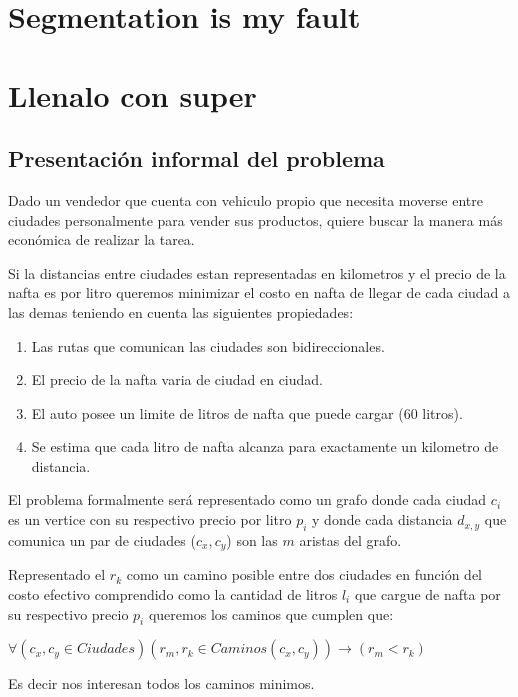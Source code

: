 \documentclass[12pt]{article}
\begin{document}
\section{Segmentation is my fault}



\section{Llenalo con super}

\subsection{Presentación informal del problema}
Dado un vendedor que cuenta con vehiculo propio que necesita moverse entre ciudades personalmente para vender sus productos, quiere buscar la manera más económica de realizar la tarea.

Si la distancias entre ciudades estan representadas en kilometros y el precio de la nafta es por litro queremos minimizar el costo en nafta de llegar de cada ciudad a las demas teniendo en cuenta las siguientes propiedades: 

\begin{enumerate}
	\item Las rutas que comunican las ciudades son bidireccionales.
	\item El precio de la nafta varia de ciudad en ciudad.
	\item El auto posee un limite de litros de nafta que puede cargar (60 litros).
	\item Se estima que cada litro de nafta alcanza para exactamente un kilometro de distancia.
\end{enumerate}

El problema formalmente será representado como un grafo donde cada ciudad $c_i$ es un vertice con su respectivo precio por litro $p_i$ y donde cada distancia $d_{x,y}$ que comunica un par de ciudades ($c_x, c_y$) son las $m$ aristas del grafo.

Representado el $r_k$ como un camino posible entre dos ciudades en función del costo efectivo comprendido como la cantidad de litros $l_i$ que cargue de nafta por su respectivo precio $p_i$ queremos los caminos que cumplen que:

$\forall(c_x, c_y \in Ciudades)(r_{m}, r_k \in Caminos(c_x,c_y))\rightarrow(r_{m} < r_k)$

Es decir nos interesan todos los caminos minimos.
\end{document}
